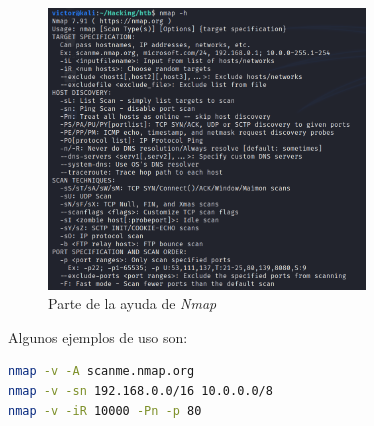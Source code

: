 \begin{figure}[h]
    \centering
    \includegraphics[width=0.75\textwidth]{images/sections/tools/nmap-help.png}
    \caption{Parte de la ayuda de \textit{Nmap}}
    \label{fig:nmap-help}
\end{figure}

Algunos ejemplos de uso son:

\begin{lstlisting}[language=bash]
nmap -v -A scanme.nmap.org
nmap -v -sn 192.168.0.0/16 10.0.0.0/8
nmap -v -iR 10000 -Pn -p 80
\end{lstlisting}